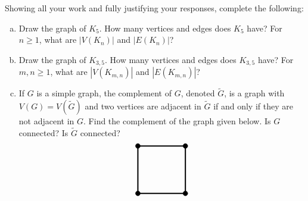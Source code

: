 \documentclass[11pt,letterpaper]{article}
\begin{document}
\newpage



 Showing all your work and fully justifying your responses, complete the following:
	\begin{enumerate}[(a)]
	\item Draw the graph of $K_5$. How many vertices and edges does $K_5$ have? For $n \geq 1$, what are $|V(K_n)|$ and $|E(K_n)|$?
	\item Draw the graph of $K_{3, 5}$. How many vertices and edges does $K_{3, 5}$ have? For $m, n \geq 1$, what are $|V(K_{m, n})|$ and $|E(K_{m, n})|$?
	\item If $G$ is a simple graph, the complement of $G$, denoted $\widetilde{G}$, is a graph with $V(G)= V(\widetilde{G})$ and two vertices are adjacent in $\widetilde{G}$ if and only if they are not adjacent in $G$. Find the complement of the graph given below. Is $G$ connected? Is $\widetilde{G}$ connected? 
		\[
		\begin{tikzpicture}[scale=2]
		\draw[line width= 0.05cm] (0,0) -- (1,0) -- (1,1) -- (0,1) -- (0,0);
		
		\draw[fill=black] (0,0) circle (0.05); 
		\draw[fill=black] (1,0) circle (0.05); 
		\draw[fill=black] (1,1) circle (0.05); 
		\draw[fill=black] (0,1) circle (0.05); 
		\end{tikzpicture}
		\]
	\end{enumerate} \pspace
\end{document}
